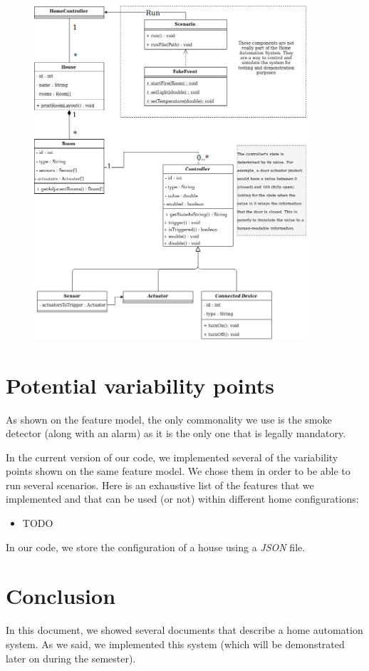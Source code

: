 		\begin{figure}[H]
            \includegraphics[width=0.9\textwidth]{class_diagram.png}
        \end{figure}
		
	\section{Potential variability points}
		As shown on the feature model, the only commonality we use is the smoke detector (along with an alarm) as it is the only one that is legally mandatory.
		
		In the current version of our code, we implemented several of the variability points shown on the same feature model. We chose them in order to be able to run several scenarios.
		Here is an exhaustive list of the features that we implemented and that can be used (or not) within different home configurations:
		\begin{itemize}
			\item TODO
		\end{itemize}
		
		In our code, we store the configuration of a house using a \textit{JSON} file.
	
	\section{Conclusion}
		In this document, we showed several documents that describe a home automation system.
		As we said, we implemented this system (which will be demonstrated later on during the semester).


